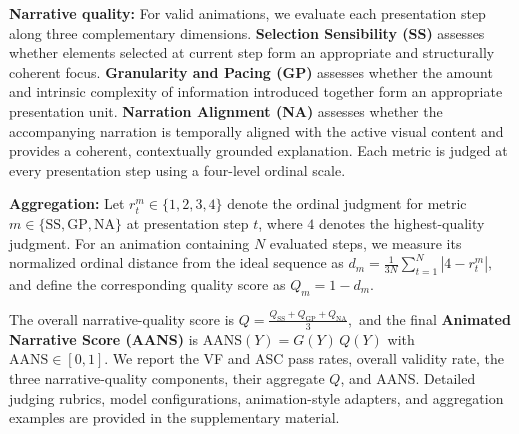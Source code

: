 \documentclass{article} %
\begin{document}
\noindent \textbf{Narrative quality:}
For valid animations, we evaluate each presentation step along three
complementary dimensions. \textbf{Selection Sensibility (SS)} assesses
whether elements selected at current step form an appropriate and
structurally coherent focus. \textbf{Granularity and Pacing (GP)} assesses
whether the amount and intrinsic complexity of information introduced
together form an appropriate presentation unit. \textbf{Narration
Alignment (NA)} assesses whether the accompanying narration is temporally
aligned with the active visual content and provides a coherent, contextually
grounded explanation. Each metric is judged at every presentation step using
a four-level ordinal scale.

\noindent \textbf{Aggregation:}
Let $r_t^m \in \{1,2,3,4\}$ denote the ordinal judgment for metric
$m\in\{\mathrm{SS},\mathrm{GP},\mathrm{NA}\}$ at presentation step $t$,
where $4$ denotes the highest-quality judgment. For an animation containing
$N$ evaluated steps, we measure its normalized ordinal distance from the
ideal sequence as 
$d_m
=
\frac{1}{3N}
\sum_{t=1}^{N}
\left|4-r_t^m\right|,
$ and define the corresponding quality score as 
$Q_m = 1-d_m$. 

The overall narrative-quality score is
$
Q
=
\frac{
Q_{\mathrm{SS}}+
Q_{\mathrm{GP}}+
Q_{\mathrm{NA}}
}{3},
$ and the final \textbf{Animated Narrative Score (AANS)} is
$\mathrm{AANS}(Y)=G(Y)\,Q(Y)$ with $\mathrm{AANS}\in[0,1]
$. We report the VF and ASC pass rates, overall validity rate, the three
narrative-quality components, their aggregate $Q$, and AANS. Detailed judging
rubrics, model configurations, animation-style adapters, and aggregation
examples are provided in the supplementary material.
\end{document}
